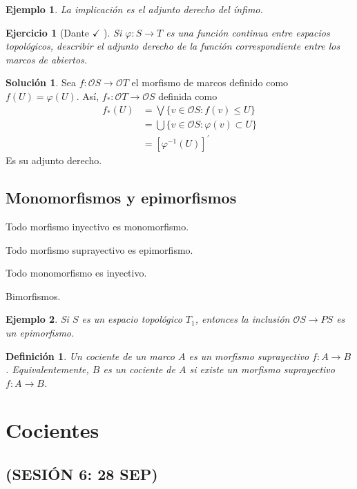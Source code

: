 \documentclass[12pt,letterpaper,titlepage]{article}
\newtheorem*{defn}{Definición}
\newtheorem{exe}{Ejercicio}
\newtheorem*{exa}{Ejemplo}
\theoremstyle{definition}
\newtheorem*{sol}{Solución}
\newcommand\Sup{\bigvee}
\renewcommand\phi{\varphi}
\renewcommand\cal[1]{\mathcal{#1}}
\newcommand\<{\langle}
\renewcommand\>{\rangle}
\begin{document}
\begin{exa}
  La implicación es el adjunto derecho del ínfimo.
\end{exa}

\begin{exe}[Dante $\checkmark$ ]
  Si $\phi:S\to T$ es una función continua entre espacios
  topológicos, describir el adjunto derecho de la función
  correspondiente entre los marcos de abiertos.
\end{exe}
\begin{sol}
    Sea $f:\mathscr{O}S\to\mathscr{O}T$ el morfismo de marcos definido como $f(U)=\phi(U)$. Así, $f_*:\mathscr{O}T\to\mathscr{O}S$ definida como 
    \begin{align*}
        f_*(U)&=\Sup\{v\in\mathscr{O}S:f(v)\leq U\}\\
        &=\bigcup\{v\in\mathscr{O}S:\phi(v)\subset U\}\\
        &=\left[\phi^{-1}(U)\right]^{\prime}
    \end{align*}
    Es su adjunto derecho.
\end{sol}
\subsection{Monomorfismos y epimorfismos}

Todo morfismo inyectivo es monomorfismo.

Todo morfismo suprayectivo es epimorfismo.

Todo monomorfismo es inyectivo.

Bimorfismos.

\begin{exa}
  Si $S$ es un espacio topológico $T_1$, entonces la inclusión
  $\cal OS\to PS$ es un epimorfismo.
\end{exa}

\begin{defn}
  Un cociente de un marco $A$ es un morfismo suprayectivo $f:A\to B$.
  Equivalentemente, $B$ es un cociente de $A$ si existe un
  morfismo suprayectivo $f:A\to B$.
\end{defn}

\section{Cocientes}

\subsection*{(SESIÓN 6: 28 SEP)}
\end{document}
